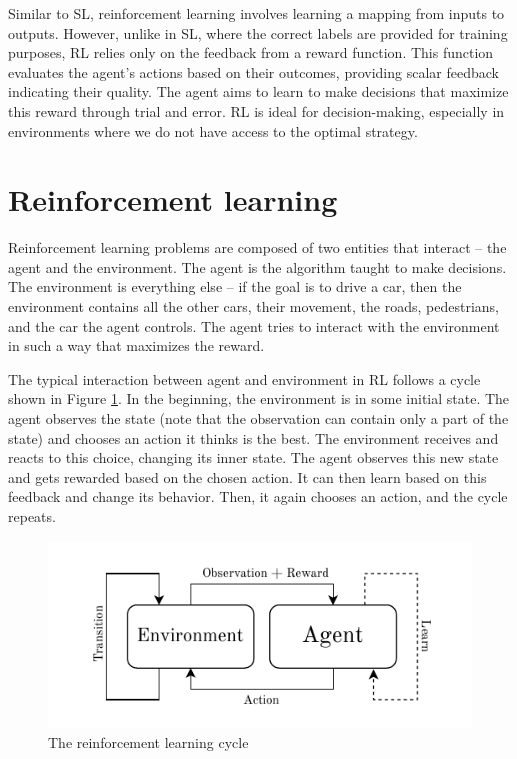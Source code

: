 \documentclass[
  digital,     %
  oneside,     %
  nosansbold,  %
  nocolorbold, %
  lof,         %
  lot,         %
]{fithesis4}
\begin{document}
Similar to SL, reinforcement learning involves learning a mapping from inputs to outputs. However, unlike in SL, where the correct labels are provided for training purposes, RL relies only on the feedback from a reward function. This function evaluates the agent's actions based on their outcomes, providing scalar feedback indicating their quality. The agent aims to learn to make decisions that maximize this reward through trial and error. RL is ideal for decision-making, especially in environments where we do not have access to the optimal strategy.

\section{Reinforcement learning}
Reinforcement learning problems are composed of two entities that interact -- the agent and the environment. The agent is the algorithm taught to make decisions. The environment is everything else -- if the goal is to drive a car, then the environment contains all the other cars, their movement, the roads, pedestrians, and the car the agent controls. The agent tries to interact with the environment in such a way that maximizes the reward.

The typical interaction between agent and environment in RL follows a cycle shown in Figure \ref{fig:rl-cycle}. In the beginning, the environment is in some initial state. The agent observes the state (note that the observation can contain only a part of the state) and chooses an action it thinks is the best. The environment receives and reacts to this choice, changing its inner state. The agent observes this new state and gets rewarded based on the chosen action. It can then learn based on this feedback and change its behavior. Then, it again chooses an action, and the cycle repeats.

\begin{figure}
    \centering
    \includegraphics[width=1\linewidth]{diagrams/rl_cycle.pdf}
    \caption{The reinforcement learning cycle}
    \label{fig:rl-cycle}
\end{figure}
\end{document}
